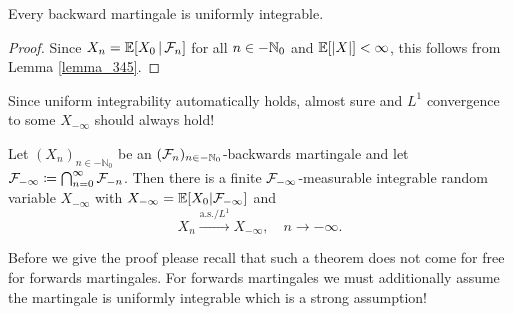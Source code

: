 \begin{ldef}
\begin{prop}\label{B1}
	Every backward martingale is uniformly integrable.
\end{prop}
\end{ldef}
\begin{proof}[Proof]
	Since $X_{n} = \mathbb{E}[X_0\,|\,\mathcal{F}_{n}]$ for all $n\in -\mathbb{N}_0$ and $\mathbb{E}[|X|]<\infty$, this follows from Lemma \ref{lemma_345}.
\end{proof}

Since uniform integrability automatically holds, almost sure and $L^1$ convergence to some $X_{-\infty}$ should always hold! 
	\marginpar{\textcolor{red}{Lecture 10}}
\begin{ldef}
\begin{theorem}\label{backwards_martingale_theorem}
	Let $(X_n)_{n\in -\mathbb{N}_0}$ be an $(\mathcal{F}_n)_{n\in -\mathbb{N}_0}$-backwards martingale and let $\mathcal{F}_{-\infty} \coloneqq \bigcap_{n=0}^{\infty} \mathcal{F}_{-n}$. Then there is a finite $\mathcal{F}_{-\infty}$-measurable integrable random variable $X_{-\infty}$ with $X_{-\infty} = \mathbb{E}[X_0|\mathcal{F}_{-\infty}]$ and $$X_n \overset{\text{a.s.}/L^1}{\rightarrow} X_{-\infty},\quad n\to -\infty .$$
\end{theorem}
\end{ldef}
Before we give the proof please recall that such a theorem does not come for free for forwards martingales. For forwards martingales we must additionally assume the martingale is uniformly integrable which is a strong assumption!
